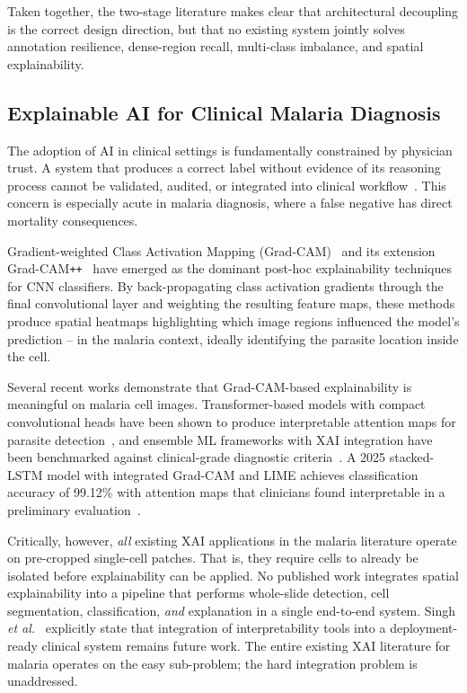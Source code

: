 \documentclass[10pt,twocolumn]{article}
\newcommand{\etal}{\textit{et al.}}
\begin{document}
Taken together, the two-stage literature makes clear that architectural
decoupling is the correct design direction, but that no existing system
jointly solves annotation resilience, dense-region recall, multi-class
imbalance, and spatial explainability.

\subsection{Explainable AI for Clinical Malaria Diagnosis}
\label{ssec:xai}

The adoption of AI in clinical settings is fundamentally constrained by
physician trust. A system that produces a correct label without evidence
of its reasoning process cannot be validated, audited, or integrated
into clinical workflow~\cite{trustworthy2025}. This concern is especially
acute in malaria diagnosis, where a false negative has direct mortality
consequences.

Gradient-weighted Class Activation Mapping (Grad-CAM)~\cite{selvaraju2017}
and its extension Grad-CAM\texttt{++}~\cite{chattopadhyay2018} have
emerged as the dominant post-hoc explainability techniques for CNN
classifiers. By back-propagating class activation gradients through the
final convolutional layer and weighting the resulting feature maps,
these methods produce spatial heatmaps highlighting which image regions
influenced the model's prediction -- in the malaria context, ideally
identifying the parasite location inside the cell.

Several recent works demonstrate that Grad-CAM-based explainability
is meaningful on malaria cell images. Transformer-based models
with compact convolutional heads have been shown to produce interpretable
attention maps for parasite detection~\cite{xai2022transformer}, and
ensemble ML frameworks with XAI integration have been benchmarked against
clinical-grade diagnostic criteria~\cite{xai_ensemble2025}. A 2025
stacked-LSTM model with integrated Grad-CAM and LIME achieves
classification accuracy of 99.12\% with attention maps that clinicians
found interpretable in a preliminary evaluation~\cite{lstm_xai2025}.

Critically, however, \emph{all} existing XAI applications in the
malaria literature operate on pre-cropped single-cell patches. That is,
they require cells to already be isolated before explainability can be
applied. No published work integrates spatial explainability into a
pipeline that performs whole-slide detection, cell segmentation,
classification, \emph{and} explanation in a single end-to-end system.
Singh \etal~\cite{singh2025} explicitly state that integration of
interpretability tools into a deployment-ready clinical system remains
future work. The entire existing XAI literature for malaria operates
on the easy sub-problem; the hard integration problem is unaddressed.
\end{document}
